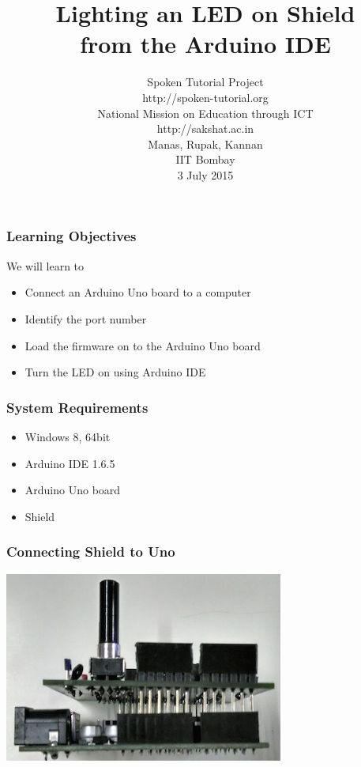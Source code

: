 \documentclass[17pt,xcolor=table]{beamer}
\begin{document}
\sffamily \bfseries
\title
[Lighting an LED on Shield from Arduino IDE]
{Lighting an LED on Shield \\ from the Arduino IDE}
\author [Manas,Rupak,Kannan]
{\small Spoken Tutorial Project \\
http://spoken-tutorial.org \\ [0.3cm]
  National Mission
  on Education 
  through ICT \\ 
  http://sakshat.ac.in \\ [0.3cm]
  Manas, Rupak, Kannan \\ IIT Bombay \\ [0.35cm]
\small 3 July 2015}
\date{}
\begin{frame}
   \titlepage
\end{frame}

\begin{frame}
\frametitle{Learning Objectives}
\vspace{-0.25in}
We will learn to 
\begin{itemize}
\item Connect an Arduino Uno board to a computer
\item Identify the port number
\item Load the firmware on to the Arduino Uno board
\item Turn the LED on using Arduino IDE
\end{itemize}
\end{frame}

\begin{frame}
\frametitle{System Requirements}
\begin{itemize}
\item Windows 8, 64bit
\item Arduino IDE 1.6.5
\item Arduino Uno board
\item Shield
\end{itemize}
\end{frame}

\begin{frame}
\frametitle{Connecting Shield to Uno}
\centerline{
\includegraphics[width=0.9\linewidth]{figures/shield-crop.jpg}
}
\end{frame}
\end{document}
